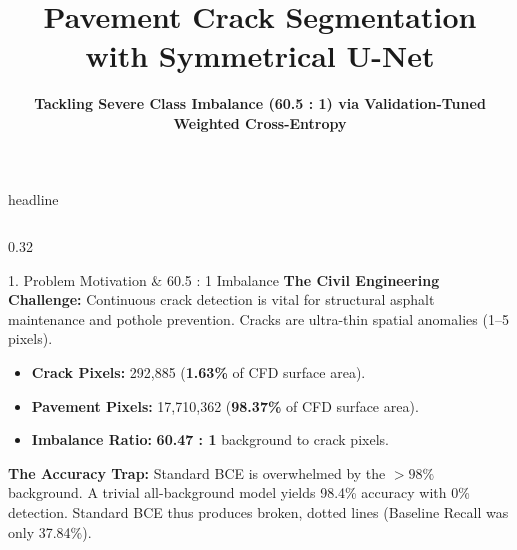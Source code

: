 \documentclass[final]{beamer}
\title{\LARGE \textbf{Pavement Crack Segmentation with Symmetrical U-Net}}
\author{\large \textbf{Tackling Severe Class Imbalance (60.5 : 1) via Validation-Tuned Weighted Cross-Entropy}}
\institute{\small Machine Learning Project $\bullet$ Problem Statement 2 $\bullet$ Benchmark: CrackForest Dataset (CFD) $\bullet$ 1.94M Parameters}
\begin{document}
\begin{frame}[t]

\begin{beamercolorbox}[wd=\paperwidth,colsep=1.5em]{headline}
  \centering
\end{beamercolorbox}

\vspace{0.8em}

\begin{columns}[t]

\begin{column}{0.32\textwidth}

\begin{block}{1. Problem Motivation \& 60.5 : 1 Imbalance}
\small
\textbf{The Civil Engineering Challenge:} Continuous crack detection is vital for structural asphalt maintenance and pothole prevention. Cracks are ultra-thin spatial anomalies (1--5 pixels).
\begin{itemize}
    \item \textbf{Crack Pixels:} 292,885 (\textbf{1.63\%} of CFD surface area).
    \item \textbf{Pavement Pixels:} 17,710,362 (\textbf{98.37\%} of CFD surface area).
    \item \textbf{Imbalance Ratio:} \textbf{60.47 : 1} background to crack pixels.
\end{itemize}
\textbf{The Accuracy Trap:} Standard BCE is overwhelmed by the $>98\%$ background. A trivial all-background model yields 98.4\% accuracy with 0\% detection. Standard BCE thus produces broken, dotted lines (Baseline Recall was only 37.84\%).
\end{block}


\end{column}
\end{columns}
\end{frame}
\end{document}

